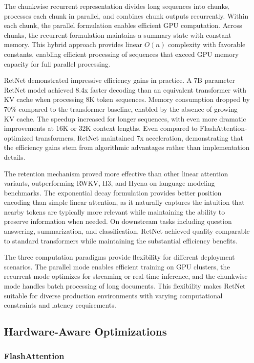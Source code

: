 \documentclass[11pt,letterpaper]{article}
\begin{document}
The chunkwise recurrent representation divides long sequences into chunks, processes each chunk in parallel, and combines chunk outputs recurrently. Within each chunk, the parallel formulation enables efficient GPU computation. Across chunks, the recurrent formulation maintains a summary state with constant memory. This hybrid approach provides linear $O(n)$ complexity with favorable constants, enabling efficient processing of sequences that exceed GPU memory capacity for full parallel processing.

RetNet demonstrated impressive efficiency gains in practice. A 7B parameter RetNet model achieved 8.4x faster decoding than an equivalent transformer with KV cache when processing 8K token sequences. Memory consumption dropped by 70\% compared to the transformer baseline, enabled by the absence of growing KV cache. The speedup increased for longer sequences, with even more dramatic improvements at 16K or 32K context lengths. Even compared to FlashAttention-optimized transformers, RetNet maintained 7x acceleration, demonstrating that the efficiency gains stem from algorithmic advantages rather than implementation details.

The retention mechanism proved more effective than other linear attention variants, outperforming RWKV, H3, and Hyena on language modeling benchmarks. The exponential decay formulation provides better position encoding than simple linear attention, as it naturally captures the intuition that nearby tokens are typically more relevant while maintaining the ability to preserve information when needed. On downstream tasks including question answering, summarization, and classification, RetNet achieved quality comparable to standard transformers while maintaining the substantial efficiency benefits.

The three computation paradigms provide flexibility for different deployment scenarios. The parallel mode enables efficient training on GPU clusters, the recurrent mode optimizes for streaming or real-time inference, and the chunkwise mode handles batch processing of long documents. This flexibility makes RetNet suitable for diverse production environments with varying computational constraints and latency requirements.

\subsection{Hardware-Aware Optimizations}

\subsubsection{FlashAttention}
\end{document}
